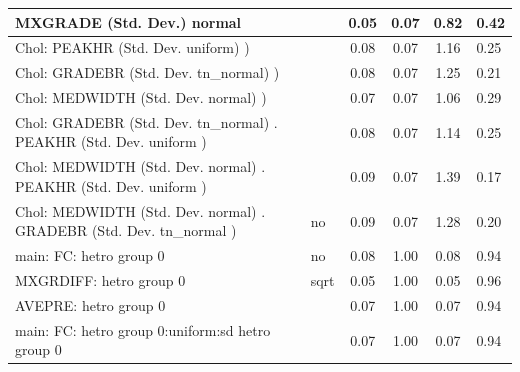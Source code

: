 \begin{table}
\begin{center}
\begin{tabular}{|l|l|c|c|c|l|}
			\hline
			MXGRADE (Std. Dev.) normal &  & 0.05 & 0.07 & 0.82 & 0.42 \\
			\hline
			 Chol: PEAKHR (Std. Dev. uniform) ) &  & 0.08 & 0.07 & 1.16 & 0.25 \\
			\hline
			 Chol: GRADEBR (Std. Dev. tn_normal) ) &  & 0.08 & 0.07 & 1.25 & 0.21 \\
			\hline
			 Chol: MEDWIDTH (Std. Dev. normal) ) &  & 0.07 & 0.07 & 1.06 & 0.29 \\
			\hline
			 Chol: GRADEBR (Std. Dev. tn_normal) . PEAKHR (Std. Dev.   uniform ) &  & 0.08 & 0.07 & 1.14 & 0.25 \\
			\hline
			 Chol: MEDWIDTH (Std. Dev. normal) . PEAKHR (Std. Dev.   uniform ) &  & 0.09 & 0.07 & 1.39 & 0.17 \\
			\hline
			 Chol: MEDWIDTH (Std. Dev. normal) . GRADEBR (Std. Dev.   tn_normal ) & no & 0.09 & 0.07 & 1.28 & 0.20 \\
			\hline
			main: FC: hetro group 0 & no & 0.08 & 1.00 & 0.08 & 0.94 \\
			\hline
			MXGRDIFF: hetro group 0 & sqrt & 0.05 & 1.00 & 0.05 & 0.96 \\
			\hline
			AVEPRE: hetro group 0 &  & 0.07 & 1.00 & 0.07 & 0.94 \\
			\hline
			main: FC: hetro group 0:uniform:sd  hetro group 0 &  & 0.07 & 1.00 & 0.07 & 0.94 \\
			\hline
		\end{tabular}
	\end{center}
\end{table}